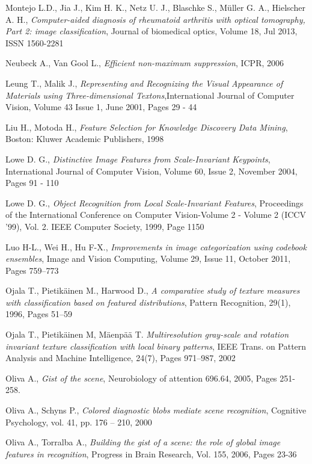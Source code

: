\begin{thebibliography}{100}
 Montejo L.D., Jia J., Kim H. K., Netz U. J., Blaschke S., Müller G. A., Hielscher A. H., \emph{Computer-aided diagnosis of rheumatoid arthritis with optical tomography, Part 2: image classification}, Journal of biomedical optics, Volume 18, Jul 2013, ISSN 1560-2281

 Neubeck A., Van Gool L., \emph{Efficient non-maximum suppression}, ICPR, 2006

 Leung T., Malik J., \emph{Representing and Recognizing the Visual Appearance of Materials using Three-dimensional Textons},International Journal of Computer Vision, Volume 43 Issue 1, June 2001, Pages 29 - 44 

 Liu H., Motoda H., \emph{Feature Selection for Knowledge Discovery Data Mining}, Boston: Kluwer Academic Publishers, 1998

 Lowe D. G., \emph{Distinctive Image Features from Scale-Invariant Keypoints}, International Journal of Computer Vision, Volume 60, Issue 2, November 2004, Pages 91 - 110 

 Lowe D. G., \emph{Object Recognition from Local Scale-Invariant Features}, Proceedings of the International Conference on Computer Vision-Volume 2 - Volume 2 (ICCV '99), Vol. 2. IEEE Computer Society, 1999, Page 1150

 Luo H-L., Wei H., Hu F-X., \emph{Improvements in image categorization using codebook ensembles}, Image and Vision Computing, Volume 29, Issue 11, October 2011, Pages 759–773

 Ojala T., Pietikäinen M., Harwood D., \emph{A comparative study of texture measures with classification based on featured distributions}, Pattern Recognition, 29(1), 1996, Pages 51–59

 Ojala T., Pietikäinen M, Mäenpää T. \emph{Multiresolution gray-scale and rotation invariant texture classification with local binary patterns}, IEEE Trans. on Pattern Analysis and Machine Intelligence, 24(7), Pages 971–987, 2002

 Oliva A., \emph{Gist of the scene}, Neurobiology of attention 696.64, 2005, Pages 251-258.

 Oliva A., Schyns P., \emph{Colored diagnostic blobs mediate scene recognition}, Cognitive Psychology, vol. 41, pp. 176 – 210, 2000

 Oliva A., Torralba A., \emph{Building the gist of a scene: the role of global image features in recognition}, Progress in Brain Research, Vol. 155, 2006, Pages 23-36


\end{thebibliography}
